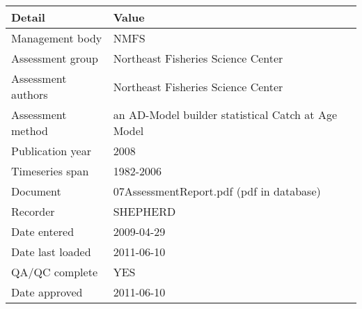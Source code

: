 \begin{table}[htb]
\centering
\begin{tabular}{lp{7cm}}
\toprule
Detail & Value \\
\midrule
Management body    & NMFS                                               \\
Assessment group   & Northeast Fisheries Science Center                 \\
Assessment authors & Northeast Fisheries Science Center                 \\
Assessment method  & an AD-Model builder statistical Catch at Age Model \\
Publication year   & 2008                                               \\
Timeseries span    & 1982-2006                                          \\
Document           & 07AssessmentReport.pdf (pdf in database)           \\
Recorder           & SHEPHERD                                           \\
Date entered       & 2009-04-29                                         \\
Date last loaded   & 2011-06-10                                         \\
QA/QC complete     & YES                                                \\
Date approved      & 2011-06-10                                         \\
\bottomrule
\end{tabular}
\label{tab:assessdet}
\end{table}
